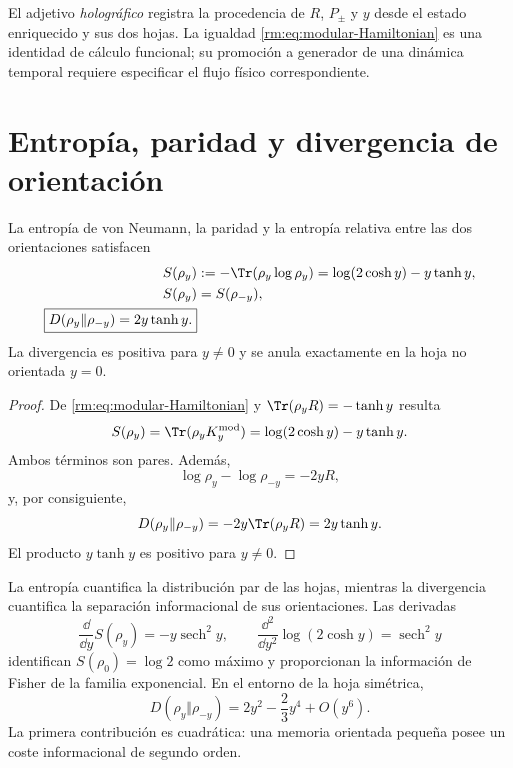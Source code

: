 El adjetivo \emph{hologr\'afico} registra la procedencia de \(R\),
\(P_\pm\) y \(y\) desde el estado enriquecido y sus dos hojas. La igualdad
\cref{rm:eq:modular-Hamiltonian} es una identidad de c\'alculo funcional; su
promoci\'on a generador de una din\'amica temporal requiere especificar el
flujo f\'isico correspondiente.

\section{Entrop\'ia, paridad y divergencia de orientaci\'on}

\begin{theorem}
\label{rm:thm:modular-information-geometry}
La entrop\'ia de von Neumann, la paridad y la entrop\'ia relativa entre las
dos orientaciones satisfacen
\begin{align}
 S(\rho_y)
 &:=-\Tr(\rho_y\log\rho_y)
 =\log(2\cosh y)-y\tanh y,
 \label{rm:eq:modular-entropy}\\
 S(\rho_y)&=S(\rho_{-y}),
 \label{rm:eq:modular-entropy-even}\\
 \boxed{
 D(\rho_y\Vert\rho_{-y})
 =2y\tanh y.}
 \label{rm:eq:modular-relative-entropy}
\end{align}
La divergencia es positiva para \(y\ne0\) y se anula exactamente en la
hoja no orientada \(y=0\).
\end{theorem}

\begin{proof}
De \cref{rm:eq:modular-Hamiltonian} y
\(\Tr(\rho_yR)=-\tanh y\) resulta
\[
 S(\rho_y)=\Tr(\rho_yK_y^{\rm mod})
 =\log(2\cosh y)-y\tanh y.
\]
Ambos t\'erminos son pares. Adem\'as,
\[
 \log\rho_y-\log\rho_{-y}=-2yR,
\]
y, por consiguiente,
\[
 D(\rho_y\Vert\rho_{-y})
 =-2y\Tr(\rho_yR)=2y\tanh y.
\]
El producto \(y\tanh y\) es positivo para \(y\ne0\).
\end{proof}

La entrop\'ia cuantifica la distribuci\'on par de las hojas, mientras la
divergencia cuantifica la separaci\'on informacional de sus orientaciones.
Las derivadas
\begin{equation}
 \frac{\dd}{\dd y}S(\rho_y)=-y\operatorname{sech}^2y,
 \qquad
 \frac{\dd^2}{\dd y^2}\log(2\cosh y)
 =\operatorname{sech}^2y
 \label{rm:eq:modular-entropy-derivatives}
\end{equation}
identifican \(S(\rho_0)=\log2\) como m\'aximo y proporcionan la informaci\'on
de Fisher de la familia exponencial. En el entorno de la hoja sim\'etrica,
\begin{equation}
 D(\rho_y\Vert\rho_{-y})
 =2y^2-\frac23y^4+O(y^6).
 \label{rm:eq:modular-relative-expansion}
\end{equation}
La primera contribuci\'on es cuadr\'atica: una memoria orientada peque\~na
posee un coste informacional de segundo orden.

